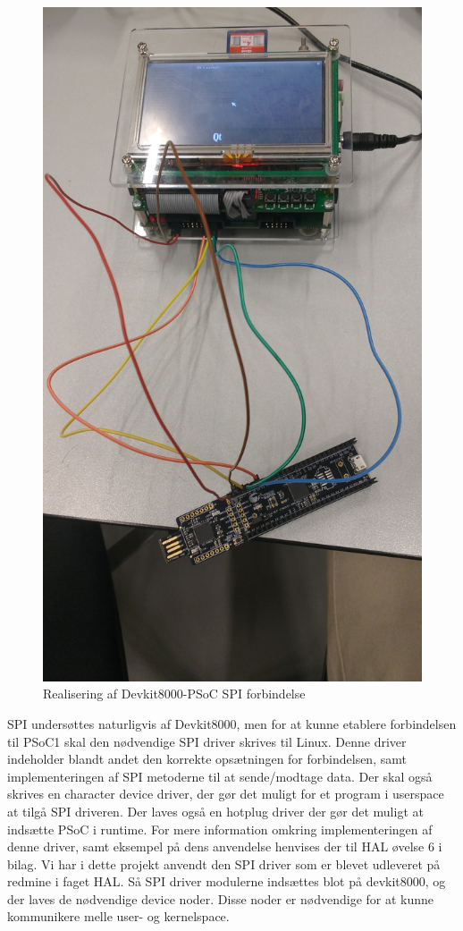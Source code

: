 \begin{figure}[H]
\includegraphics[scale=0.15]{Screenshots/Realisering_devkit_psoc}
\caption{Realisering af Devkit8000-PSoC SPI forbindelse}
\end{figure}

SPI undersøttes naturligvis af Devkit8000, men for at kunne etablere forbindelsen til PSoC1 skal den nødvendige SPI driver skrives til Linux. 
Denne driver indeholder blandt andet den korrekte opsætningen for forbindelsen, samt implementeringen af SPI metoderne til at sende/modtage data.
Der skal også skrives en character device driver, der gør det muligt for et program i userspace at tilgå SPI driveren. Der laves også en hotplug driver 
der gør det muligt at indsætte PSoC i runtime. For mere information omkring implementeringen af denne driver, samt eksempel på dens anvendelse henvises der til HAL 
øvelse 6 i bilag. 
Vi har i dette projekt anvendt den SPI driver som er blevet udleveret på redmine i faget HAL. Så SPI driver modulerne indsættes blot på devkit8000, og der 
laves de nødvendige device noder. Disse noder er nødvendige for at kunne kommunikere melle user- og kernelspace. 

